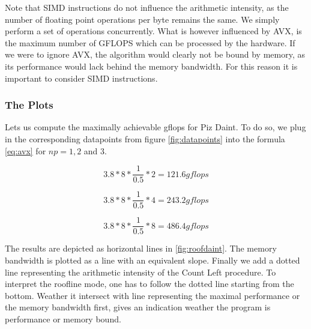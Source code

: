 \documentclass[]{article}
\begin{document}
Note that SIMD instructions do not influence the arithmetic intensity, as the number of floating point operations per byte remains the same. We simply perform a set of operations concurrently. What is however influenced by AVX, is the maximum number of GFLOPS which can be processed by the hardware. If we were to ignore AVX, the algorithm would clearly not be bound by memory, as its performance would lack behind the memory bandwidth. For this reason it is important to consider SIMD instructions.

\subsubsection{The Plots}

Lets us compute the maximally achievable gflops for Piz Daint. To do so, we plug in the corresponding datapoints from figure \ref{fig:datapoints} into the formula \ref{eq:avx} for $np = 1, 2$ and $3$.

\begin{center}
	\begin{equation}
		3.8 * 8 * \frac{1}{0.5} * 2 = 121.6 gflops
	\end{equation}
	\label{eq:daintp1}
\end{center}

\begin{center}
	\begin{equation}
		3.8 * 8 * \frac{1}{0.5} * 4 = 243.2 gflops
	\end{equation}
	\label{eq:daintp2}
\end{center}

\begin{center}
	\begin{equation}
		3.8 * 8 * \frac{1}{0.5} * 8 = 486.4 gflops
	\end{equation}
	\label{eq:daintp3}
\end{center}

The results are depicted as horizontal lines in \ref{fig:roofdaint}. The memory bandwidth is plotted as a line with an equivalent slope. Finally we add a dotted line representing the arithmetic intensity of the Count Left procedure. 
To interpret the roofline mode, one has to follow the dotted line starting from the bottom. Weather it intersect with line representing the maximal performance or the memory bandwidth first, gives an indication weather the program is performance or memory bound. 
\end{document}
